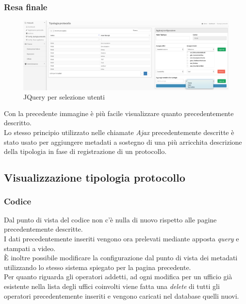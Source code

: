     \subsubsection{Resa finale}
        \begin{figure}[!h] 
            \centering 
            \includegraphics[width=\textwidth]{immagini/prodottofinito/configtipo.png}
            \caption{JQuery per selezione utenti}
        \end{figure}
        Con la precedente immagine è più facile visualizzare quanto precedentemente descritto.
        \\
        Lo stesso principio utilizzato nelle chiamate \textit{Ajax} precedentemente descritte è stato usato per aggiungere metadati a sostegno di una più arricchita descrizione della tipologia in fase di registrazione di un protocollo.
        
\subsection{Visualizzazione tipologia protocollo}
    \subsubsection{Codice}
        Dal punto di vista del codice non c'è nulla di nuovo rispetto alle pagine precedentemente descritte.
        \\
        I dati precedentemente inseriti vengono ora prelevati mediante apposta \textit{query} e stampati a video.
        \\
        È inoltre possibile modificare la configurazione dal punto di vista dei metadati utilizzando lo stesso sistema spiegato per la pagina precedente. 
        \\
        Per quanto riguarda gli operatori addetti, ad ogni modifica per un ufficio già esistente nella lista degli uffici coinvolti viene fatta una \textit{delete} di tutti gli operatori precedentemente inseriti e vengono caricati nel database quelli nuovi.
